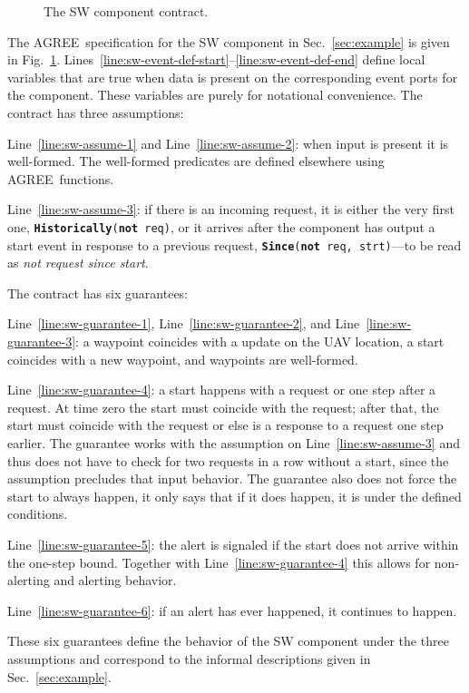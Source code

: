 \documentclass[global,twocolumn]{svjour}
\newcommand{\figref}[1]{Fig.~\ref{#1}}
\newcommand{\secref}[1]{Sec.~\ref{#1}}
\newcommand{\lineref}[1]{Line~\ref{#1}}
\newcommand{\linesref}[2]{Lines~\ref{#1}--\ref{#2}}
\newcommand{\agr}{AGREE}
\begin{document}
\begin{figure}
  \begin{center}
    \resizebox{\columnwidth}{!}{\usebox{\sw}}
  \end{center}
  \caption{The SW component contract.}
  \label{fig:sw}
\end{figure}

The \agr\ specification for the SW component in \secref{sec:example} is given in \figref{fig:sw}.
%
\linesref{line:sw-event-def-start}{line:sw-event-def-end} define local variables that are true when data is present on the corresponding event ports for the component.  These variables are
purely for notational convenience.
%
The contract has three assumptions:
%
\begin{compactitem}
\item
\lineref{line:sw-assume-1} and \lineref{line:sw-assume-2}:
%
when input is present it is well-formed.
%
The well-formed predicates are defined elsewhere using \agr\ functions.

\item
\lineref{line:sw-assume-3}:
%
if there is an incoming request, it is either the very first one, \texttt{\textbf{Historically}(\textbf{not} req)}, or it arrives after the component has output a start event in response to a previous request, \texttt{\textbf{Since}(\textbf{not} req, strt)}---to be read as \emph{not
request since start}.
\end{compactitem}

\noindent The contract has six guarantees:
%
\begin{compactitem}
\item
\lineref{line:sw-guarantee-1}, \lineref{line:sw-guarantee-2}, and \lineref{line:sw-guarantee-3}:
%
a waypoint coincides with a update on the UAV location, a start coincides with a new waypoint, and waypoints are well-formed.

\item
\lineref{line:sw-guarantee-4}:
%
a start happens with a request or one step after a request.
%
At time zero the start must coincide with the request;
%
after that, the start must coincide with the request or else is a response to a request one step earlier.
%
The guarantee works with the assumption on \lineref{line:sw-assume-3} and thus does not have to check for two requests in a row without a start, since the assumption precludes that input behavior.
%
The guarantee also does not force the start to always happen, it only says that if it does happen, it is under the defined conditions.

\item
\lineref{line:sw-guarantee-5}:
%
the alert is signaled if the start does not arrive within the one-step bound.
%
Together with \lineref{line:sw-guarantee-4} this allows for non-alerting and alerting behavior.

\item
%
\lineref{line:sw-guarantee-6}:
%
if an alert has ever happened, it continues to happen.
\end{compactitem}
%
These six guarantees define the behavior of the SW component under the three assumptions and correspond to the informal descriptions given in \secref{sec:example}.
\end{document}
